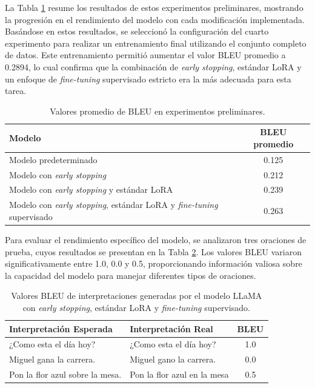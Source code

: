 La Tabla \ref{tab:BLEUmodelos} resume los resultados de estos experimentos preliminares, mostrando la progresión en el rendimiento del modelo con cada modificación implementada. Basándose en estos resultados, se seleccionó la configuración del cuarto experimento para realizar un entrenamiento final utilizando el conjunto completo de datos. Este entrenamiento permitió aumentar el valor BLEU promedio a 0.2894, lo cual confirma que la combinación de \textit{early stopping}, estándar LoRA y un enfoque de \textit{fine-tuning} supervisado estricto era la más adecuada para esta tarea.

\vspace{0.5cm}
\begin{table}[H]
    \centering
    \begin{tabular}{|l|c|}
        \hline
        \textbf{Modelo} & \textbf{BLEU promedio} \\
        \hline
        Modelo predeterminado & 0.125 \\
        \hline
        Modelo con \textit{early stopping} & 0.212\\
        \hline
        Modelo con \textit{early stopping} y estándar LoRA & 0.239\\
        \hline
        Modelo con \textit{early stopping}, estándar LoRA y \textit{fine-tuning} supervisado & 0.263 \\
        \hline
    \end{tabular}
    \caption{Valores promedio de BLEU en experimentos preliminares.}
    \label{tab:BLEUmodelos}
\end{table}

Para evaluar el rendimiento específico del modelo, se analizaron tres oraciones de prueba, cuyos resultados se presentan en la Tabla \ref{tab:oracionesBLEU}. Los valores BLEU variaron significativamente entre 1.0, 0.0 y 0.5, proporcionando información valiosa sobre la capacidad del modelo para manejar diferentes tipos de oraciones.

\vspace{0.5cm}
\begin{table}[H]
    \centering
    \begin{tabular}{|l|l|c|}
        \hline
        \textbf{Interpretación Esperada} & \textbf{Interpretación Real} & \textbf{BLEU} \\
        \hline
        ¿Como esta el día hoy? & ¿Como esta el día hoy? & 1.0 \\
        \hline
        Miguel gana la carrera. & Miguel gano la carrera. & 0.0\\
        \hline
        Pon la flor azul sobre la mesa. & Pon la flor azul en la mesa & 0.5 \\
        \hline
    \end{tabular}
    \caption{Valores BLEU de interpretaciones generadas por el modelo LLaMA con \textit{early stopping}, estándar LoRA y \textit{fine-tuning} supervisado.}
    \label{tab:oracionesBLEU}
\end{table}



